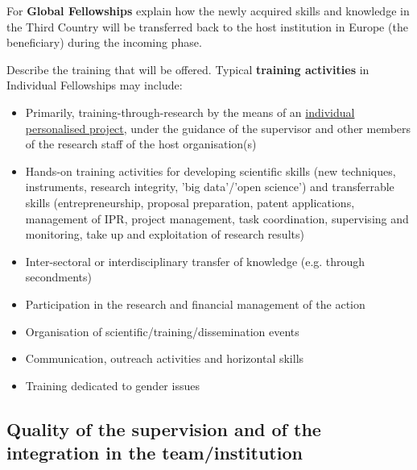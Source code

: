 \noindent
For \textbf{Global Fellowships} explain how the newly acquired skills and knowledge in the Third Country will be transferred back to the host institution in Europe (the beneficiary) during the incoming phase.

\medskip\noindent
Describe the training that will be offered. Typical \textbf{training activities} in Individual Fellowships may include:
\begin{itemize}
\item Primarily, training-through-research by the means of an \ul{individual personalised
project}, under the guidance of the supervisor and other members of the research
staff of the host organisation(s)
\item Hands-on training activities for developing scientific skills (new techniques,
instruments, research integrity, 'big data'/'open science') and transferrable skills
(entrepreneurship, proposal preparation, patent applications,
management of IPR, project management, task coordination, supervising and
monitoring, take up and exploitation of research results)
\item Inter-sectoral or interdisciplinary transfer of knowledge (e.g. through secondments)
\item Participation in the research and financial management of the action
\item Organisation of scientific/training/dissemination events
\item Communication, outreach activities and horizontal skills
\item Training dedicated to gender issues
\end{itemize}

\medskip\noindent
\setlength{\fboxsep}{1mm}


\subsection{Quality of the supervision and of the integration in the team/institution}
\label{sec:excellence_supervision}

